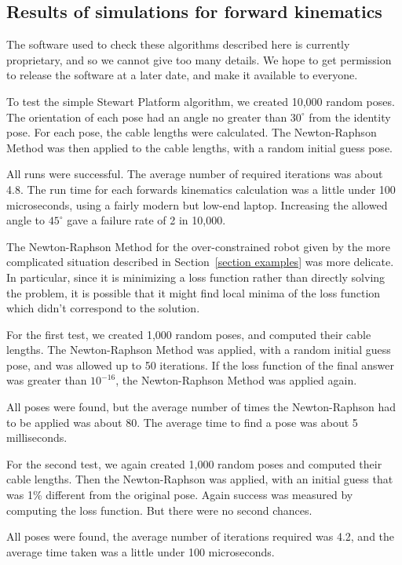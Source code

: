 \documentclass[reqno,12pt]{amsart}
\begin{document}
\subsection{Results of simulations for forward kinematics}
\label{s results}

The software used to check these algorithms described here is currently proprietary, and so we cannot give too many details.  We hope to get permission to release the software at a later date, and make it available to everyone.

To test the simple Stewart Platform algorithm, we created 10,000 random poses.  The orientation of each pose had an angle no greater than $30^\circ$ from the identity pose.  For each pose, the cable lengths were calculated.  The Newton-Raphson Method was then applied to the cable lengths, with a random initial guess pose.

All runs were successful.  The average number of required iterations was about 4.8.  The run time for each forwards kinematics calculation was a little under 100 microseconds, using a fairly modern but low-end laptop.  Increasing the allowed angle to $45^\circ$ gave a failure rate of 2 in 10,000.

The Newton-Raphson Method for the over-constrained robot given by the more complicated situation described in Section~\ref{section examples} was more delicate.  In particular, since it is minimizing a loss function rather than directly solving the problem, it is possible that it might find local minima of the loss function which didn't correspond to the solution.

For the first test, we created 1,000 random poses, and computed their cable lengths.  The Newton-Raphson Method was applied, with a random initial guess pose, and was allowed up to 50 iterations.  If the loss function of the final answer was greater than $10^{-16}$, the Newton-Raphson Method was applied again.

All poses were found, but the average number of times the Newton-Raphson had to be applied was about 80.  The average time to find a pose was about 5 milliseconds.

For the second test, we again created 1,000 random poses and computed their cable lengths.  Then the Newton-Raphson was applied, with an initial guess that was 1\% different from the original pose.  Again success was measured by computing the loss function.  But there were no second chances.

All poses were found, the average number of iterations required was 4.2, and the average time taken was a little under 100 microseconds.
\end{document}
